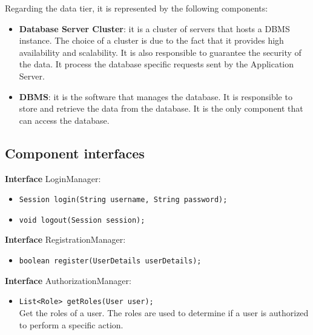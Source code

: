 Regarding the data tier, it is represented by the following components:
\begin{itemize}
    \item \textbf{Database Server Cluster}: it is a cluster of servers that hosts a DBMS instance. The choice of a cluster is due to the fact that it provides high availability and scalability. It is also responsible to guarantee the security of the data. It process the database specific requests sent by the Application Server.
    \item \textbf{DBMS}: it is the software that manages the database. It is responsible to store and retrieve the data from the database. It is the only component that can access the database.
\end{itemize}
\subsection{Component interfaces}

\textbf{Interface} LoginManager:
\begin{itemize}
    \item \texttt{Session login(String username, String password);}
    \item \texttt{void logout(Session session);}
\end{itemize}

\textbf{Interface} RegistrationManager:
\begin{itemize}
    \item \texttt{boolean register(UserDetails userDetails);}
\end{itemize}

\textbf{Interface} AuthorizationManager:
\begin{itemize}
    \item \texttt{List<Role> getRoles(User user);}
    \\ Get the roles of a user. The roles are used to determine if a user is authorized to perform a specific action.
\end{itemize}


